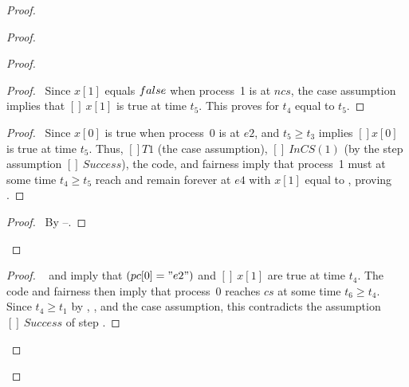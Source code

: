 \documentclass[fleqn,leqno]{article}
\begin{document}
\begin{proof}
\begin{proof}
\begin{proof}
     \begin{proof}
      \pf\ Since $x[1]$ equals $\FALSE$ when process~1 is at $ncs$,
       the case assumption implies that $[]~x[1]$ is true at
       time $t_{5}$. This proves 
       for $t_{4}$ equal to $t_{5}$.
     \end{proof}
     \begin{proof}
     \pf\ Since $x[0]$ is true when process~0 is at $e2$,
      and $t_{5}\geq t_{3}$ implies $[]x[0]$ is true
     at time $t_{5}$.  Thus, $[]T1$ (the case assumption), 
     $[]~InCS(1)$ (by the step  assumption $[]~Success$),
     the code, and fairness imply that
      process~1 must at some time $t_{4}\geq t_{5}$ reach and remain
      forever at $e4$ with $x[1]$ equal to \FALSE, proving .
     \end{proof}
   \qedstep
      \begin{proof}
      \pf\ By --.
      \end{proof}  
 \end{proof}

\qedstep
  \begin{proof}
   \pf\  and  imply that
   $(pc[0] = "e2")$ and $[]~x[1]$ are true at time $t_{4}$.  The
   code and fairness then imply that process~0 reaches $cs$ at some
   time $t_{6}\geq t_{4}$.  Since $t_{4}\geq t_{1}$ by
   , , and the  case assumption,
   this contradicts the assumption $[]~Success$ of step .
  \end{proof}


\end{proof}
\end{proof}
\end{document}
